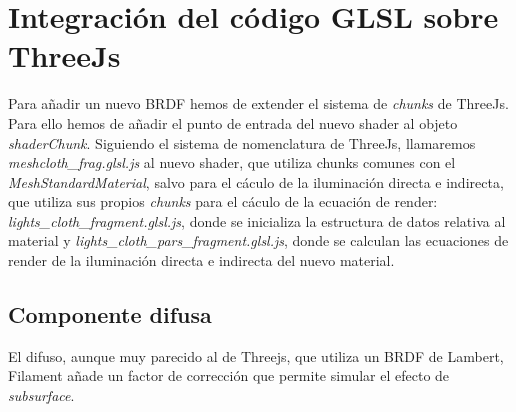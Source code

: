 



\section{Integraci\'on del c\'odigo GLSL sobre ThreeJs}
  Para a\~nadir un nuevo BRDF hemos de extender el sistema de \textit{chunks} de ThreeJs. Para ello hemos de a\~nadir el
  punto de entrada del nuevo shader al objeto \textit{shaderChunk}. Siguiendo el sistema de nomenclatura de ThreeJs,
  llamaremos \textit{meshcloth\_frag.glsl.js} al nuevo shader, que utiliza chunks comunes con el \textit{MeshStandardMaterial},
  salvo para el c\'aculo de la iluminaci\'on directa e indirecta, que utiliza sus propios \textit{chunks} para el c\'aculo
  de la ecuaci\'on de render: \textit{lights\_cloth\_fragment.glsl.js}, donde se inicializa la estructura de datos relativa
  al material y \textit{lights\_cloth\_pars\_fragment.glsl.js}, donde se calculan las ecuaciones de render de la iluminaci\'on
  directa e indirecta del nuevo material.

  \subsection{Componente difusa}

  El difuso, aunque muy parecido al de Threejs, que utiliza un BRDF de Lambert,
  Filament a\~nade un factor de correcci\'on que permite simular el efecto de \textit{subsurface}.

